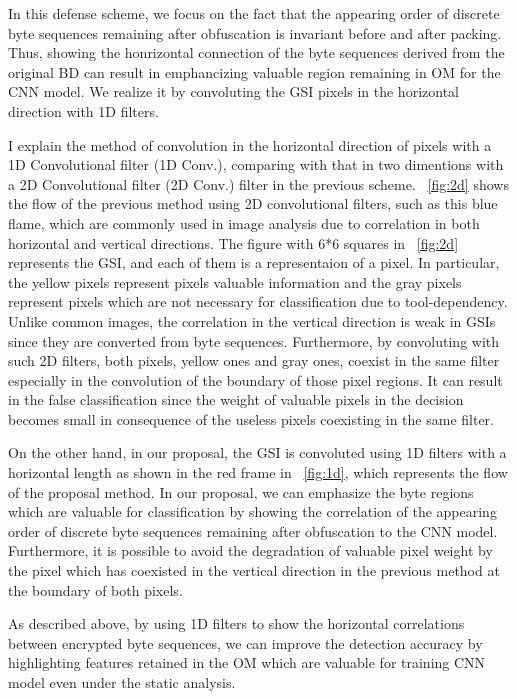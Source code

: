 \documentclass{ieeeaccess}
\begin{document}
In this defense scheme, we focus on the fact that the appearing order of discrete byte sequences remaining after obfuscation is invariant before and after packing.
Thus, showing the honrizontal connection of the byte sequences derived from the original BD can result in emphancizing valuable region remaining in OM for the CNN model.
We realize it by convoluting the GSI pixels in the horizontal direction with 1D filters.

I explain the method of convolution in the horizontal direction of pixels with a 1D Convolutional filter (1D Conv.), comparing with that in two dimentions with a 2D Convolutional filter (2D Conv.) filter in the previous scheme.
\figurename~\ref{fig:2d} shows the flow of the previous method using 2D convolutional filters, such as this blue flame, which are commonly used in image analysis due to correlation in both horizontal and vertical directions.
The figure with 6*6 squares in \figurename~\ref{fig:2d} represents the GSI, and each of them is a representaion of a pixel.
In particular, the yellow pixels represent pixels valuable information and the gray pixels represent pixels which are not necessary for classification due to tool-dependency.
Unlike common images, the correlation in the vertical direction is weak in GSIs since they are converted from byte sequences.
Furthermore, by convoluting with such 2D filters, both pixels, yellow ones and gray ones, coexist in the same filter especially in the convolution of the boundary of those pixel regions.
It can result in the false classification since the weight of valuable pixels in the decision becomes small in consequence of the useless pixels coexisting in the same filter.

On the other hand, in our proposal, the GSI is convoluted using 1D filters with a horizontal length as shown in the red frame in \figurename~\ref{fig:1d}, which represents the flow of the proposal method.
In our proposal, we can emphasize the byte regions which are valuable for classification by showing the correlation of the appearing order of discrete byte sequences remaining after obfuscation to the CNN model.
Furthermore, it is possible to avoid the degradation of valuable pixel weight by the pixel which has coexisted in the vertical direction in the previous method at the boundary of both pixels.

As described above, by using 1D filters to show the horizontal correlations between encrypted byte sequences, we can improve the detection accuracy by highlighting features retained in the OM which are valuable for training CNN model even under the static analysis.
\end{document}
